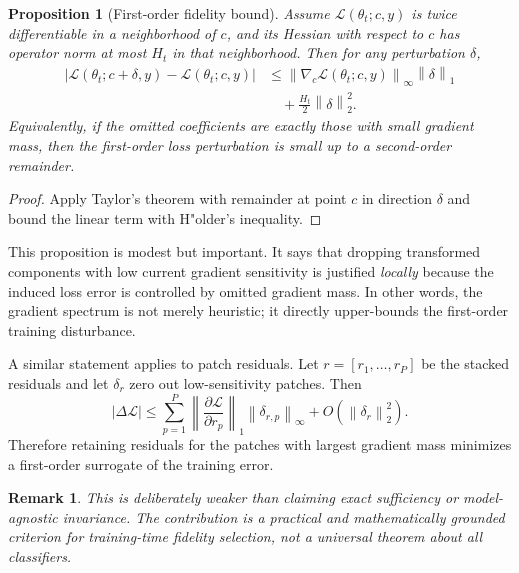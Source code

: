 \documentclass[10pt,twocolumn]{article}
\newtheorem{proposition}{Proposition}
\newtheorem{remark}{Remark}
\newcommand{\norm}[1]{\left\lVert #1 \right\rVert}
\newcommand{\abs}[1]{\left\lvert #1 \right\rvert}
\newcommand{\Lagr}{\mathcal{L}}
\begin{document}
\begin{proposition}[First-order fidelity bound]
Assume $\Lagr(\theta_t; c, y)$ is twice differentiable in a neighborhood of $c$, and its Hessian with respect to $c$ has operator norm at most $H_t$ in that neighborhood. Then for any perturbation $\delta$,
\begin{equation}
\begin{aligned}
    \abs{\Lagr(\theta_t; c+\delta, y) - \Lagr(\theta_t; c, y)}
    &\le \norm{\nabla_c \Lagr(\theta_t; c, y)}_\infty \norm{\delta}_1 \\
    &\quad + \frac{H_t}{2}\norm{\delta}_2^2.
\end{aligned}
\end{equation}
Equivalently, if the omitted coefficients are exactly those with small gradient mass, then the first-order loss perturbation is small up to a second-order remainder.
\end{proposition}

\begin{proof}
Apply Taylor's theorem with remainder at point $c$ in direction $\delta$ and bound the linear term with H"older's inequality.
\end{proof}

This proposition is modest but important. It says that dropping transformed components with low current gradient sensitivity is justified \emph{locally} because the induced loss error is controlled by omitted gradient mass. In other words, the gradient spectrum is not merely heuristic; it directly upper-bounds the first-order training disturbance.

A similar statement applies to patch residuals. Let $r = [r_1,\dots,r_P]$ be the stacked residuals and let $\delta_r$ zero out low-sensitivity patches. Then
\begin{equation}
    \abs{\Delta \Lagr} \le \sum_{p=1}^{P} \left\lVert \frac{\partial \Lagr}{\partial r_p} \right\rVert_1 \norm{\delta_{r,p}}_\infty + O(\norm{\delta_r}_2^2).
\end{equation}
Therefore retaining residuals for the patches with largest gradient mass minimizes a first-order surrogate of the training error.

\begin{remark}
This is deliberately weaker than claiming exact sufficiency or model-agnostic invariance. The contribution is a practical and mathematically grounded criterion for \emph{training-time fidelity selection}, not a universal theorem about all classifiers.
\end{remark}
\end{document}
